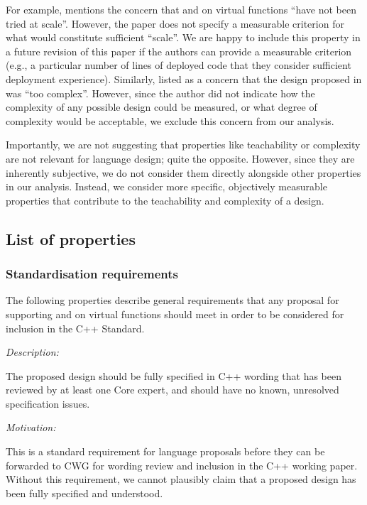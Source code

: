 For example, \cite{P3573R0} mentions the concern that  and  on virtual functions ``have not been tried at scale''. However, the paper does not specify a measurable criterion for what would constitute sufficient ``scale''. We are happy to include this property in a future revision of this paper if the authors can provide a measurable criterion (e.g., a particular number of lines of deployed code that they consider sufficient deployment experience). Similarly, \cite{P3506R0} listed as a concern that the design proposed in \cite{P3097R0} was ``too complex''. However, since the author did not indicate how the complexity of any possible design could be measured, or what degree of complexity would be acceptable, we exclude this concern from our analysis.

Importantly, we are not suggesting that properties like teachability or complexity are not relevant for language design; quite the opposite. However, since they are inherently subjective, we do not consider them directly alongside other properties in our analysis. Instead, we consider more specific, objectively measurable properties that contribute to the teachability and complexity of a design.

\subsection{List of properties}


\subsubsection{Standardisation requirements}

The following properties describe general requirements that any proposal for supporting  and  on virtual functions should meet in order to be considered for inclusion in the C++ Standard.


\emph{Description:}

The proposed design should be fully specified in C++ wording that has been reviewed by at least one Core expert, and should have no known, unresolved specification issues.

\emph{Motivation:}

 This is a standard requirement for language proposals before they can be forwarded to CWG for wording review and inclusion in the C++ working paper.  Without this requirement, we cannot plausibly claim that a proposed design has been fully specified and understood.

